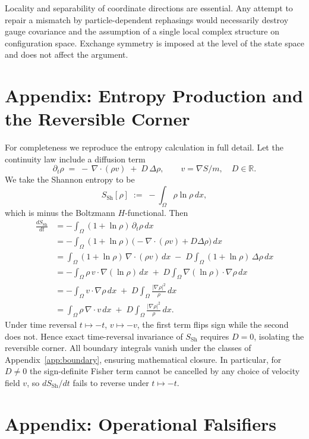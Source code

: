 \documentclass[11pt,a4paper]{article}
\numberwithin{equation}{section}
\theoremstyle{thmcompact}
\theoremstyle{remark}
\begin{document}
Locality and separability of coordinate directions are essential. Any attempt to repair a mismatch by particle-dependent rephasings would necessarily destroy gauge covariance and the assumption of a single local complex structure on configuration space.
Exchange symmetry is imposed at the level of the state space and does not affect the argument.

\section{Appendix: Entropy Production and the Reversible Corner}
\label{app:entropy-rigorous}

For completeness we reproduce the entropy calculation in full detail.
Let the continuity law include a diffusion term
\[
\partial_t\rho \;=\; -\,\nabla\!\cdot(\rho v)\;+\;D\,\Delta\rho,
\qquad
v=\nabla S/m,\quad D\in\mathbb{R}.
\]
We take the Shannon entropy to be
\[
S_{\mathrm{Sh}}[\rho]
\;:=\;
-\int_\Omega \rho\ln\rho\,dx,
\]
which is minus the Boltzmann $H$-functional.
Then
\begin{align*}
	\frac{dS_{\mathrm{Sh}}}{dt}
	&= -\int_\Omega (1+\ln\rho)\,\partial_t\rho\,dx\\
	&= -\int_\Omega (1+\ln\rho)\,\big(-\nabla\!\cdot(\rho v)+D\Delta\rho\big)\,dx\\
	&= \int_\Omega (1+\ln\rho)\,\nabla\!\cdot(\rho v)\,dx
	\;-\;D\int_\Omega (1+\ln\rho)\,\Delta\rho\,dx\\
	&= -\int_\Omega \rho\,v\cdot\nabla(\ln\rho)\,dx
	\;+\;D\int_\Omega \nabla(\ln\rho)\cdot\nabla\rho\,dx\\
	&= -\int_\Omega v\cdot\nabla\rho\,dx
	\;+\;D\int_\Omega \frac{|\nabla\rho|^2}{\rho}\,dx\\
	&= \int_\Omega \rho\,\nabla\!\cdot v\,dx
	\;+\;D\int_\Omega \frac{|\nabla\rho|^2}{\rho}\,dx.
\end{align*}
Under time reversal $t\mapsto -t$, $v\mapsto -v$,
the first term flips sign while the second does not.
Hence exact time-reversal invariance of $S_{\mathrm{Sh}}$ requires $D=0$,
isolating the reversible corner.
All boundary integrals vanish under the classes of
Appendix~\ref{app:boundary}, ensuring mathematical closure. In particular, for $D\neq0$ the sign-definite Fisher term cannot be cancelled by any choice of velocity field $v$, so $dS_{\mathrm{Sh}}/dt$ fails to reverse under $t\mapsto -t$.


\section{Appendix: Operational Falsifiers}
\label{app:ops-falsifiers}
\end{document}
